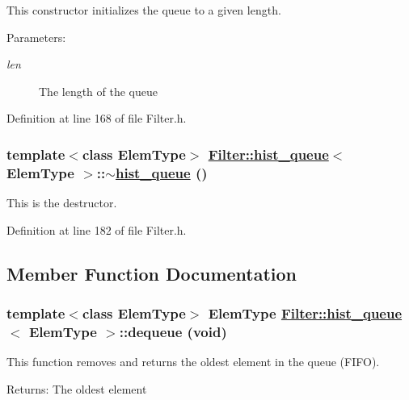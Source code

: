 This constructor initializes the queue to a given length.

\begin{Desc}
\item[Parameters:]
\begin{description}
\item[{\em len}]The length of the queue \end{description}
\end{Desc}


Definition at line 168 of file Filter.h.\hypertarget{classFilter_1_1hist__queue_a1}{
\subsubsection[$\sim$hist\_\-queue]{\setlength{\rightskip}{0pt plus 5cm}template$<$class Elem\-Type$>$ \hyperlink{classFilter_1_1hist__queue}{Filter::hist\_\-queue}$<$ Elem\-Type $>$::$\sim$\hyperlink{classFilter_1_1hist__queue}{hist\_\-queue} ()}}
\label{classFilter_1_1hist__queue_a1}


This is the destructor. 

Definition at line 182 of file Filter.h.

\subsection{Member Function Documentation}
\hypertarget{classFilter_1_1hist__queue_a2}{
\subsubsection[dequeue]{\setlength{\rightskip}{0pt plus 5cm}template$<$class Elem\-Type$>$ Elem\-Type \hyperlink{classFilter_1_1hist__queue}{Filter::hist\_\-queue}$<$ Elem\-Type $>$::dequeue (void)}}
\label{classFilter_1_1hist__queue_a2}


This function removes and returns the oldest element in the queue (FIFO). \begin{Desc}
\item[Returns:]The oldest element \end{Desc}


